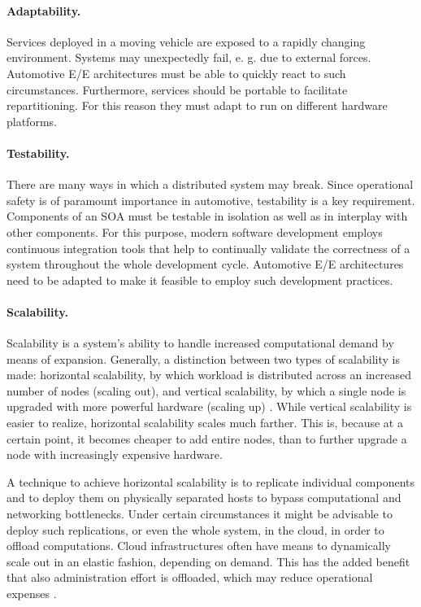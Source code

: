 \paragraph{Adaptability.}
Services deployed in a moving vehicle are exposed to a rapidly changing environment. Systems may unexpectedly fail, e. g. due to external forces. Automotive E/E architectures must be able to quickly react to such circumstances. Furthermore, services should be portable to facilitate repartitioning. For this reason they must adapt to run on different hardware platforms.

\paragraph{Testability.}
There are many ways in which a distributed system may break. Since operational safety is of paramount importance in automotive, testability is a key requirement. Components of an SOA must be testable in isolation as well as in interplay with other components. For this purpose, modern software development employs continuous integration tools that help to continually validate the correctness of a system throughout the whole development cycle. Automotive E/E architectures need to be adapted to make it feasible to employ such development practices.


\paragraph{Scalability.}
Scalability is a system's ability to handle increased computational demand by means of expansion. Generally, a distinction between two types of scalability is made: horizontal scalability, by which workload is distributed across an increased number of nodes (scaling out), and vertical scalability, by which a single node is upgraded with more powerful hardware (scaling up) \cite{tanenbaum2017distributed}. While vertical scalability is easier to realize, horizontal scalability scales much farther. This is, because at a certain point, it becomes cheaper to add entire nodes, than to further upgrade a node with increasingly expensive hardware.

A technique to achieve horizontal scalability is to replicate individual components and to deploy them on physically separated hosts to bypass computational and networking bottlenecks. Under certain circumstances it might be advisable to deploy such replications, or even the whole system, in the cloud, in order to offload computations. Cloud infrastructures often have means to dynamically scale out in an elastic fashion, depending on demand. This has the added benefit that also administration effort is offloaded, which may reduce operational expenses \cite{vaquero2011dynamically}.

